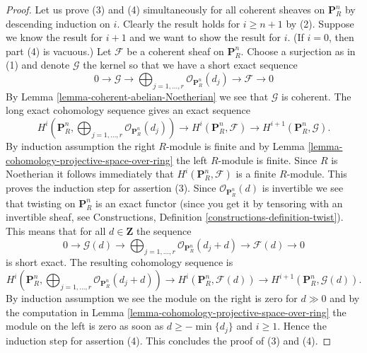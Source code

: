 \documentclass{stacks-project}
\theoremstyle{plain}
\theoremstyle{definition}
\theoremstyle{remark}
\numberwithin{equation}{subsection}
\begin{document}
\begin{proof}
\medskip\noindent
Let us prove (3) and (4) simultaneously for all coherent sheaves
on $\mathbf{P}^n_R$ by descending induction on $i$. Clearly the result
holds for $i \geq n + 1$ by (2). Suppose we know the result for
$i + 1$ and we want to show the result for $i$. (If $i = 0$, then
part (4) is vacuous.) Let $\mathcal{F}$ be a coherent sheaf on
$\mathbf{P}^n_R$. Choose a surjection as in (1) and denote
$\mathcal{G}$ the kernel so that we have a short exact sequence
$$
0 \to \mathcal{G} \to
\bigoplus\nolimits_{j = 1, \ldots, r}
\mathcal{O}_{\mathbf{P}^n_R}(d_j)
\to
\mathcal{F} \to 0
$$
By Lemma \ref{lemma-coherent-abelian-Noetherian}
we see that $\mathcal{G}$ is coherent. The long exact
cohomology sequence gives an exact sequence
$$
H^i(\mathbf{P}^n_R, \bigoplus\nolimits_{j = 1, \ldots, r}
\mathcal{O}_{\mathbf{P}^n_R}(d_j))
\to
H^i(\mathbf{P}^n_R, \mathcal{F})
\to
H^{i + 1}(\mathbf{P}^n_R, \mathcal{G}).
$$
By induction assumption the right $R$-module is finite and by
Lemma \ref{lemma-cohomology-projective-space-over-ring} the left
$R$-module is finite. Since $R$ is Noetherian it follows immediately
that $H^i(\mathbf{P}^n_R, \mathcal{F})$ is a finite $R$-module.
This proves the induction step for assertion (3).
Since $\mathcal{O}_{\mathbf{P}^n_R}(d)$ is invertible
we see that twisting on $\mathbf{P}^n_R$ is an exact functor (since
you get it by tensoring with an invertible sheaf, see
Constructions, Definition \ref{constructions-definition-twist}).
This means that for all $d \in \mathbf{Z}$ the sequence
$$
0 \to \mathcal{G}(d) \to
\bigoplus\nolimits_{j = 1, \ldots, r}
\mathcal{O}_{\mathbf{P}^n_R}(d_j + d)
\to
\mathcal{F}(d) \to 0
$$
is short exact. The resulting cohomology sequence is
$$
H^i(\mathbf{P}^n_R, \bigoplus\nolimits_{j = 1, \ldots, r}
\mathcal{O}_{\mathbf{P}^n_R}(d_j + d))
\to
H^i(\mathbf{P}^n_R, \mathcal{F}(d))
\to
H^{i + 1}(\mathbf{P}^n_R, \mathcal{G}(d)).
$$
By induction assumption we see the module on the right is zero
for $d \gg 0$ and by the computation in
Lemma \ref{lemma-cohomology-projective-space-over-ring}
the module on the left is zero as soon as $d \geq -\min\{d_j\}$
and $i \geq 1$. Hence the induction step for assertion (4).
This concludes the proof of (3) and (4).


\end{proof}
\end{document}

